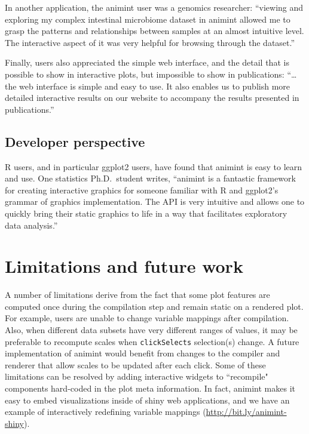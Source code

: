 \documentclass[12pt,]{article}
\theoremstyle{definition}
\theoremstyle{definition}
\theoremstyle{remark}
\begin{document}
In another application, the animint user was a genomics researcher:
``viewing and exploring my complex intestinal microbiome dataset in
animint allowed me to grasp the patterns and relationships between
samples at an almost intuitive level. The interactive aspect of it was
very helpful for browsing through the dataset.''

Finally, users also appreciated the simple web interface, and the detail
that is possible to show in interactive plots, but impossible to show in
publications: ``\ldots{} the web interface is simple and easy to use. It
also enables us to publish more detailed interactive results on our
website to accompany the results presented in publications.''

\subsection{Developer perspective}\label{developer-perspective}

R users, and in particular ggplot2 users, have found that animint is
easy to learn and use. One statistics Ph.D.~student writes, ``animint is
a fantastic framework for creating interactive graphics for someone
familiar with R and ggplot2's grammar of graphics implementation. The
API is very intuitive and allows one to quickly bring their static
graphics to life in a way that facilitates exploratory data analysis.''

\section{Limitations and future work}\label{limitations}

A number of limitations derive from the fact that some plot features are
computed once during the compilation step and remain static on a
rendered plot. For example, users are unable to change variable mappings
after compilation. Also, when different data subsets have very different
ranges of values, it may be preferable to recompute scales when
\texttt{clickSelects} selection(s) change. A future implementation of
animint would benefit from changes to the compiler and renderer that
allow scales to be updated after each click. Some of these limitations
can be resolved by adding interactive widgets to ``recompile" components
hard-coded in the plot meta information. In fact, animint makes it easy
to embed visualizations inside of shiny web applications, and we have an
example of interactively redefining variable mappings
(\url{http://bit.ly/animint-shiny}).
\end{document}
